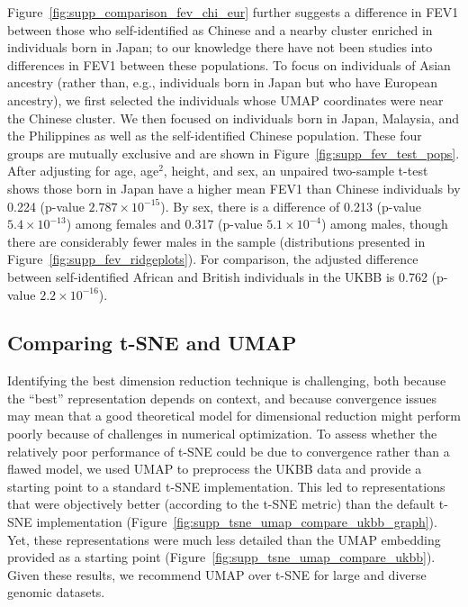 Figure~\ref{fig:supp_comparison_fev_chi_eur} further suggests a difference in FEV1 between those who self-identified as Chinese and a nearby cluster enriched in individuals born in Japan; to our knowledge there have not been studies into differences in FEV1 between these populations. To focus on individuals of Asian ancestry (rather than, e.g., individuals born in Japan but who have European ancestry), we first selected the individuals whose UMAP coordinates were near the Chinese cluster. We then focused on individuals born in Japan, Malaysia, and the Philippines as well as the self-identified Chinese population. These four groups are mutually exclusive and are shown in Figure~\ref{fig:supp_fev_test_pops}. After adjusting for age, age$^2$, height, and sex, an unpaired two-sample t-test shows those born in Japan have a higher mean FEV1 than Chinese individuals by 0.224 (p-value $2.787\times 10^{-15}$). By sex, there is a difference of 0.213 (p-value $5.4\times 10^{-13}$) among females and 0.317 (p-value $5.1\times 10^{-4}$) among males, though there are considerably fewer males in the sample (distributions presented in Figure~\ref{fig:supp_fev_ridgeplots}). For comparison, the adjusted difference between self-identified African and British individuals in the UKBB is 0.762 (p-value $2.2\times 10^{-16}$).

\subsection{Comparing t-SNE and UMAP}
Identifying the best dimension reduction technique is challenging, both because the ``best'' representation depends on context, and because convergence issues may mean that a good theoretical model for dimensional reduction might perform poorly because of challenges in numerical optimization. To assess whether the relatively poor performance of t-SNE could be due to convergence rather than a flawed model, we used UMAP to preprocess the UKBB data and provide a starting point to a standard t-SNE implementation. This led to representations that were objectively better (according to the t-SNE metric) than the default t-SNE implementation (Figure~\ref{fig:supp_tsne_umap_compare_ukbb_graph}). Yet, these representations were much less detailed than the UMAP embedding provided as a starting point (Figure~\ref{fig:supp_tsne_umap_compare_ukbb}).  Given these results, we recommend UMAP over t-SNE for large and diverse genomic datasets.

